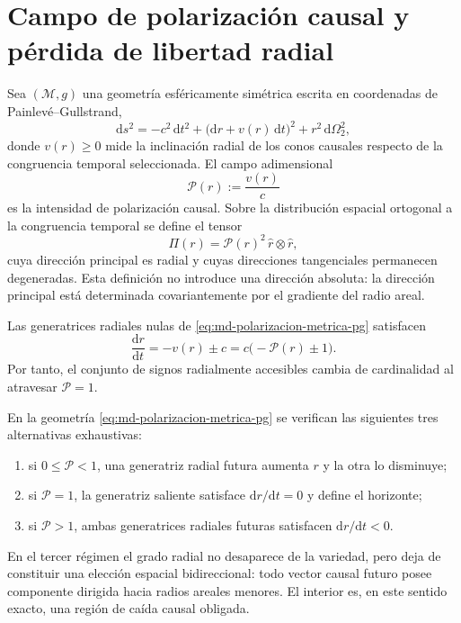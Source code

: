 
\section{Campo de polarización causal y pérdida de libertad radial}
\label{sec:md-polarizacion-causal-definicion}

Sea \((\mathcal M,g)\) una geometría esféricamente simétrica escrita en
coordenadas de Painlevé--Gullstrand,
\begin{equation}
 \mathrm ds^2
 =-c^2\,\mathrm dt^2
  +\bigl(\mathrm dr+v(r)\,\mathrm dt\bigr)^2
  +r^2\,\mathrm d\Omega_2^2,
 \label{eq:md-polarizacion-metrica-pg}
\end{equation}
donde \(v(r)\geq0\) mide la inclinación radial de los conos causales respecto
de la congruencia temporal seleccionada. El campo adimensional
\begin{equation}
 \mathcal P(r):=\frac{v(r)}{c}
 \label{eq:md-polarizacion-parametro}
\end{equation}
es la intensidad de polarización causal. Sobre la distribución espacial
ortogonal a la congruencia temporal se define el tensor
\begin{equation}
 \Pi(r)=\mathcal P(r)^2\,\widehat r\otimes\widehat r,
 \label{eq:md-polarizacion-tensor}
\end{equation}
cuya dirección principal es radial y cuyas direcciones tangenciales
permanecen degeneradas. Esta definición no introduce una dirección absoluta:
la dirección principal está determinada covariantemente por el gradiente del
radio areal.

Las generatrices radiales nulas de \eqref{eq:md-polarizacion-metrica-pg}
satisfacen
\begin{equation}
 \frac{\mathrm dr}{\mathrm dt}=-v(r)\pm c
 =c\bigl(-\mathcal P(r)\pm1\bigr).
 \label{eq:md-polarizacion-generatrices}
\end{equation}
Por tanto, el conjunto de signos radialmente accesibles cambia de cardinalidad
al atravesar \(\mathcal P=1\).

\begin{theorem}
\label{thm:md-polarizacion-caida-obligada}
En la geometría \eqref{eq:md-polarizacion-metrica-pg} se verifican las
siguientes tres alternativas exhaustivas:
\begin{enumerate}
 \item si \(0\leq\mathcal P<1\), una generatriz radial futura aumenta \(r\)
 y la otra lo disminuye;
 \item si \(\mathcal P=1\), la generatriz saliente satisface
 \(\mathrm dr/\mathrm dt=0\) y define el horizonte;
 \item si \(\mathcal P>1\), ambas generatrices radiales futuras satisfacen
 \(\mathrm dr/\mathrm dt<0\).
\end{enumerate}
En el tercer régimen el grado radial no desaparece de la variedad, pero deja
de constituir una elección espacial bidireccional: todo vector causal futuro
posee componente dirigida hacia radios areales menores. El interior es, en
este sentido exacto, una región de caída causal obligada.
\end{theorem}

